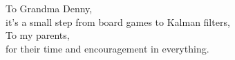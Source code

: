 \makeatletter
\let\@currsize\normalsize
\begin{frontmatter}
\makefrontmatter

%
%
\begin{dedication} %
To Grandma Denny, \\
it's a small step from board games to Kalman filters, \\
To my parents, \\
for their time and encouragement in everything.
\end{dedication}

%
%




%


\end{frontmatter}
